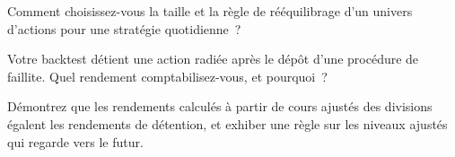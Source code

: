 \begin{interviewq}\label{iq:rs:universe-symbology-and-corporate-actions:4}
Comment choisissez-vous la taille et la règle de rééquilibrage d'un univers d'actions pour une stratégie quotidienne~?
\end{interviewq}

\begin{interviewq}\label{iq:rs:universe-symbology-and-corporate-actions:5}
Votre backtest détient une action radiée après le dépôt d'une procédure de faillite. Quel rendement comptabilisez-vous, et pourquoi~?
\end{interviewq}

\begin{interviewq}\label{iq:rs:universe-symbology-and-corporate-actions:6}
Démontrez que les rendements calculés à partir de cours ajustés des divisions égalent les rendements de détention, et exhiber une règle sur les niveaux ajustés qui regarde vers le
futur.
\end{interviewq}

